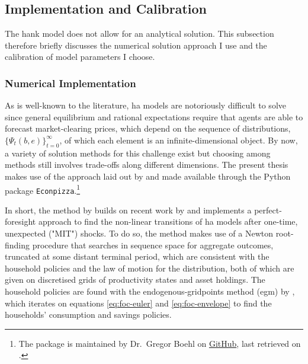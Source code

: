 \documentclass[12pt]{article} %
\numberwithin{equation}{section} %
\begin{document}
\subsection{Implementation and Calibration}
\label{sec:model-implementation}

The \Gls{hank} model does not allow for an analytical solution. This subsection therefore briefly discusses the numerical solution approach I use and the calibration of model parameters I choose.

\subsubsection*{Numerical Implementation}

As is well-known to the literature, \Gls{ha} models are notoriously difficult to solve since general equilibrium and rational expectations require that agents are able to forecast market-clearing prices, which depend on the sequence of distributions, $\{ \Psi_t (b,e) \}_{t=0}^{\infty} $, of which each element is an infinite-dimensional object. By now, a variety of solution methods for this challenge exist but choosing among methods still involves trade-offs along different dimensions. The present thesis makes use of the approach laid out by \textcite{boehl2023econpizza} and made available through the Python package \texttt{Econpizza}.\footnote{The package is maintained by Dr.~Gregor Boehl on \href{https://github.com/gboehl/econpizza}{GitHub}, last retrieved on .}

In short, the method by \textcite{boehl2023econpizza} builds on recent work by \textcite{auclert2021} and implements a perfect-foresight approach to find the non-linear transitions of \Gls{ha} models after one-time, unexpected ("MIT") shocks. To do so, the method makes use of a Newton root-finding procedure that searches in sequence space for aggregate outcomes, truncated at some distant terminal period, which are consistent with the household policies and the law of motion for the distribution, both of which are given on discretised grids of productivity states and asset holdings. The household policies are found with the endogenous-gridpoints method (\Gls{egm}) by \textcite{carroll2006}, which iterates on equations \eqref{eq:foc-euler} and \eqref{eq:foc-envelope} to find the households' consumption and savings policies.
\end{document}
